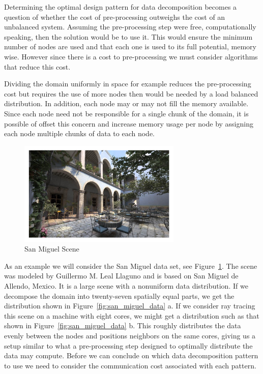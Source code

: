 Determining the optimal design pattern for data decomposition becomes a question
of whether the cost of pre-processing outweighs the cost of an unbalanced 
system.  Assuming the pre-processing step were free, computationally speaking, 
then the solution would be to use it.  This would ensure the minimum number of
nodes are used and that each one is used to its full potential, memory wise.  
However since there is a cost to pre-processing we must consider algorithms that
reduce this cost.  

Dividing the domain uniformly in space for example reduces the pre-processing 
cost but requires the use of more nodes then would be needed by a load balanced
distribution.  In addition, each node may or may not fill the memory available. 
Since each node need not be responsible for a single chunk of the domain, it is 
possible of offset this concern and increase memory usage per node by assigning 
each node multiple chunks of data to each node.

\begin{figure}[!htb]
\centering
  \includegraphics[height=5cm]{drawings/sanmiguel_cam25.pdf}
\caption{San Miguel Scene}
\label{fig:san_miguel}
\end{figure}

As an example we will consider the San Miguel data set, see 
Figure~\ref{fig:san_miguel}.  The scene was modeled by Guillermo M. Leal Llaguno
and is based on San Miguel de Allendo, Mexico.  It is a large scene with a 
nonuniform data distribution.  If we decompose the domain into twenty-seven 
spatially equal parts, we get the distribution shown in 
Figure~\ref{fig:san_miguel_data} a.  If we consider ray tracing this scene on a
machine with eight cores, we might get a distribution such as that shown
in Figure~\ref{fig:san_miguel_data} b.   This roughly distributes the data 
evenly between the nodes and positions neighbors on the same cores, giving us a
setup similar to what a pre-processing step designed to optimally distribute the 
data may compute.  Before we can conclude on which data decomposition pattern to 
use we need to consider the communication cost associated with each pattern.

